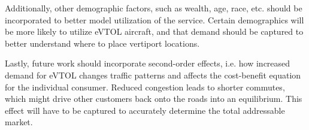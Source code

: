 \documentclass{article}
\begin{document}
Additionally, other demographic factors, such as wealth, age, race, etc. should be incorporated to better model utilization of the service. Certain demographics will be more likely to utilize eVTOL aircraft, and that demand should be captured to better understand where to place vertiport locations.

Lastly, future work should incorporate second-order effects, i.e. how increased demand for eVTOL changes traffic patterns and affects the cost-benefit equation for the individual consumer. Reduced congestion leads to shorter commutes, which might drive other customers back onto the roads into an equilibrium. This effect will have to be captured to accurately determine the total addressable market.

\pagebreak

\begin{appendix}
  \listoffigures
  \listoftables
\end{appendix}
\end{document}
